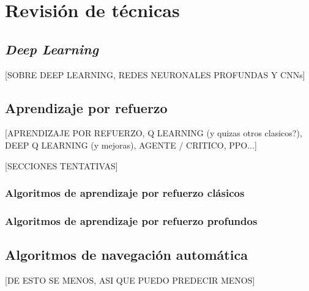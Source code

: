 \chapter{Revisión de técnicas}

\section{\textit{Deep Learning}}
[SOBRE DEEP LEARNING, REDES NEURONALES PROFUNDAS Y CNNs]

\section{Aprendizaje por refuerzo}
[APRENDIZAJE POR REFUERZO, Q LEARNING (y quizas otros clasicos?), DEEP Q LEARNING (y mejoras), AGENTE / CRITICO, PPO...]

[SECCIONES TENTATIVAS]
\subsection{Algoritmos de aprendizaje por refuerzo clásicos}

\subsection{Algoritmos de aprendizaje por refuerzo profundos}


\section{Algoritmos de navegación automática}
[DE ESTO SE MENOS, ASI QUE PUEDO PREDECIR MENOS]